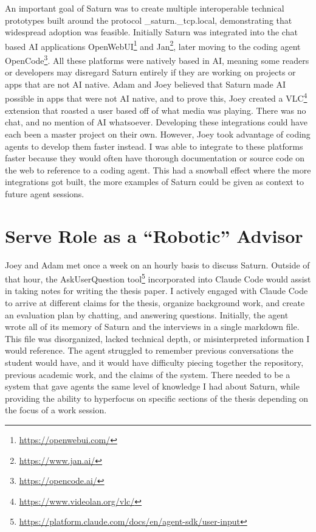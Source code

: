 An important goal of Saturn was to create multiple interoperable technical prototypes built around the protocol \_saturn.\_tcp.local, demonstrating that widespread adoption was feasible. Initially Saturn was integrated into the chat based AI applications OpenWebUI\footnote{\url{https://openwebui.com/}} and Jan\footnote{\url{https://www.jan.ai/}}, later moving to the coding agent OpenCode\footnote{\url{https://opencode.ai/}}. All these platforms were natively based in AI, meaning some readers or developers may disregard Saturn entirely if they are working on projects or apps that are not AI native. Adam and Joey believed that Saturn made AI possible in apps that were not AI native, and to prove this, Joey created a VLC\footnote{\url{https://www.videolan.org/vlc/}} extension that roasted a user based off of what media was playing. There was no chat, and no mention of AI whatsoever. Developing these integrations could have each been a master project on their own. However, Joey took advantage of coding agents to develop them faster instead. I was able to integrate to these platforms faster because they would often have thorough documentation or source code on the web to reference to a coding agent. This had a snowball effect where the more integrations got built, the more examples of Saturn could be given as context to future agent sessions.

\section{Serve Role as a ``Robotic'' Advisor}

Joey and Adam met once a week on an hourly basis to discuss Saturn. Outside of that hour, the AskUserQuestion tool\footnote{\url{https://platform.claude.com/docs/en/agent-sdk/user-input}} incorporated into Claude Code would assist in taking notes for writing the thesis paper. I actively engaged with Claude Code to arrive at different claims for the thesis, organize background work, and create an evaluation plan by chatting, and answering questions. Initially, the agent wrote all of its memory of Saturn and the interviews in a single markdown file. This file was disorganized, lacked technical depth, or misinterpreted information I would reference. The agent struggled to remember previous conversations the student would have, and it would have difficulty piecing together the repository, previous academic work, and the claims of the system. There needed to be a system that gave agents the same level of knowledge I had about Saturn, while providing the ability to hyperfocus on specific sections of the thesis depending on the focus of a work session.

